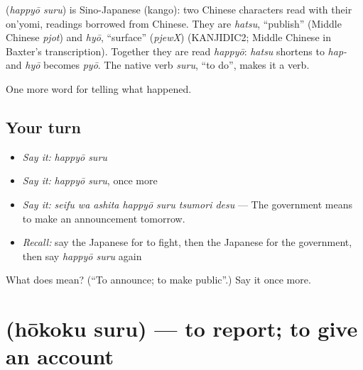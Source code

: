 \begin{cousinweb}
\textbf{} (\emph{happyō suru}) is Sino-Japanese (kango): two Chinese characters read with their on'yomi, readings borrowed from Chinese. They are \emph{hatsu}, \textquotedblleft{}publish\textquotedblright{} (Middle Chinese \emph{pjot}) and \emph{hyō}, \textquotedblleft{}surface\textquotedblright{} (\emph{pjewX}) (KANJIDIC2; Middle Chinese in Baxter's transcription). Together they are read \emph{happyō}: \emph{hatsu} shortens to \emph{hap-} and \emph{hyō} becomes \emph{pyō}. The native verb \emph{suru}, \textquotedblleft{}to do\textquotedblright{}, makes it a verb.
\end{cousinweb}

\begin{grammarlens}[title={What you've built}]
One more word for telling what happened.
\end{grammarlens}

\subsection*{Your turn}
\begin{itemize}
\raggedright
  \item \emph{Say it:} \emph{happyō suru}
  \item \emph{Say it:} \emph{happyō suru}, once more
  \item \emph{Say it:} \emph{seifu wa ashita happyō suru tsumori desu} — The government means to make an announcement tomorrow.
  \item \emph{Recall:} say the Japanese for to fight, then the Japanese for the government, then say \emph{happyō suru} again
\end{itemize}

\begin{tcolorbox}[breakable,colback=teal!4,colframe=teal!35!black,title={Before you move on}]
What does  mean? (\textquotedblleft{}To announce; to make public\textquotedblright{}.) Say it once more.
\end{tcolorbox}
\section[\texorpdfstring{\ja{ほうこくする} (hōkoku suru)}{ほうこくする (hōkoku suru)}]{ (hōkoku suru) — to report; to give an account}

\label{lesson:JA-C283-houkoku-suru}



